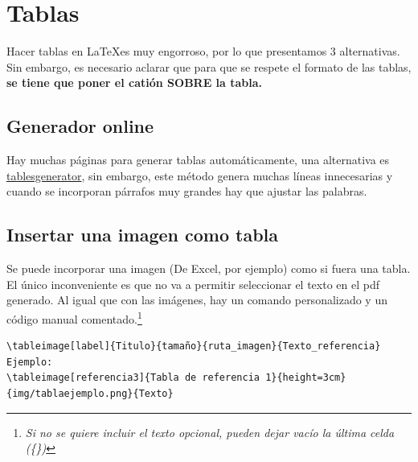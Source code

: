 \begin{figure}[b]
\end{figure}

\newpage

\section{Tablas}

Hacer tablas en \LaTeX es muy engorroso, por lo que presentamos 3 alternativas. Sin embargo, es necesario aclarar que para que se respete el formato de las tablas, \textbf{se tiene que poner el catión SOBRE la tabla.}

\subsection{Generador online}
Hay muchas páginas para generar tablas automáticamente, una alternativa es \href{https://www.tablesgenerator.com}{tablesgenerator}, sin embargo, este método genera muchas líneas innecesarias y cuando se incorporan párrafos muy grandes hay que ajustar las palabras.

\subsection{Insertar una imagen como tabla}
Se puede incorporar una imagen (De Excel, por ejemplo) como si fuera una tabla. El único inconveniente es que no va a permitir seleccionar el texto en el pdf generado. Al igual que con las imágenes, hay un comando personalizado y un código manual comentado.\footnote{\textit{Si no se quiere incluir el texto opcional, pueden dejar vacío la última celda (\{\})}}
\begin{verbatim} 
\tableimage[label]{Titulo}{tamaño}{ruta_imagen}{Texto_referencia}
Ejemplo:
\tableimage[referencia3]{Tabla de referencia 1}{height=3cm}{img/tablaejemplo.png}{Texto}
\end{verbatim}



